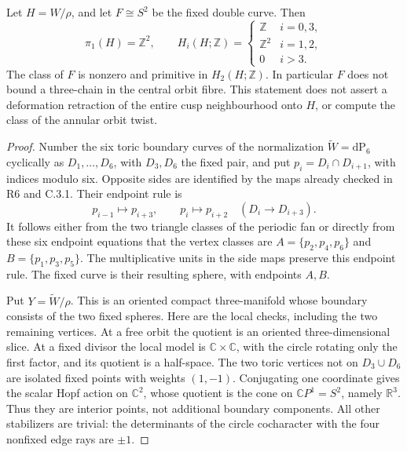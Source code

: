 \begin{proposition}
Let \(H=W/\rho\), and let \(F\cong S^2\) be the fixed double
curve. Then
\[
 \pi_1(H)=\mathbb Z^2,\qquad
 H_i(H;\mathbb Z)=
 \begin{cases}
 \mathbb Z&i=0,3,\\
 \mathbb Z^2&i=1,2,\\
 0&i>3.
 \end{cases}
\]
The class of \(F\) is nonzero and primitive in \(H_2(H;\mathbb Z)\).
In particular \(F\) does not bound a three-chain in the central
orbit fibre. This statement does not assert a deformation retraction
of the entire cusp neighbourhood onto \(H\), or compute the class
of the annular orbit twist.
\end{proposition}
\begin{proof}
Number the six toric boundary curves of the normalization
\(\widetilde W=\mathrm{dP}_6\) cyclically as
\(D_1,\ldots,D_6\), with \(D_3,D_6\) the fixed pair, and put
\(p_i=D_i\cap D_{i+1}\), with indices modulo six. Opposite sides
are identified by the maps already checked in R6 and C.3.1.
Their endpoint rule is
\[
 p_{i-1}\longmapsto p_{i+3},\qquad
 p_i\longmapsto p_{i+2}\quad(D_i\longrightarrow D_{i+3}).
\]
It follows either from the two triangle classes of the periodic
fan or directly from these six endpoint equations that the vertex
classes are
\(A=\{p_2,p_4,p_6\}\) and \(B=\{p_1,p_3,p_5\}\).
The multiplicative units in the side maps preserve this endpoint
rule. The fixed curve is their resulting sphere, with endpoints
\(A,B\).

Put \(Y=\widetilde W/\rho\). This is an oriented compact
three-manifold whose boundary consists of the two fixed spheres.
Here are the local checks, including the two remaining vertices.
At a free orbit the quotient is an oriented three-dimensional
slice. At a fixed divisor the local model is
\(\mathbb C\times\mathbb C\), with the circle rotating only
the first factor, and its quotient is a half-space. The two toric
vertices not on \(D_3\cup D_6\) are isolated fixed points with
weights \((1,-1)\). Conjugating one coordinate gives the scalar
Hopf action on \(\mathbb C^2\), whose quotient is the cone on
\(\mathbb CP^1=S^2\), namely \(\mathbb R^3\). Thus they are
interior points, not additional boundary components.
All other stabilizers are trivial: the determinants of the circle
cocharacter with the four nonfixed edge rays are \(\pm1\).


\end{proof}
